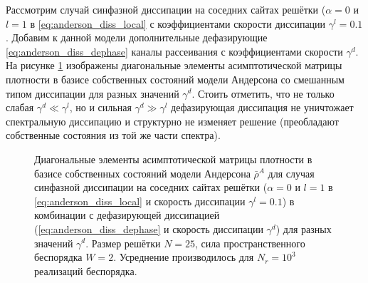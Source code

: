 Рассмотрим случай синфазной диссипации на соседних сайтах решётки (\(\alpha=0\) и \(l=1\) в \cref{eq:anderson_diss_local} с коэффициентами скорости диссипации \(\gamma^l = 0.1\). Добавим к данной модели дополнительные дефазирующие \cref{eq:anderson_diss_dephase} каналы рассеивания с коэффициентами скорости \(\gamma^d\). На рисунке \cref{fig:anderson_rho_nn_with_dephasing} изображены диагональные элементы асимптотической матрицы плотности в базисе собственных состояний модели Андерсона со смешанным типом диссипации для разных значений \(\gamma^d\). Стоить отметить, что не только слабая \(\gamma^d \ll \gamma^l\), но и сильная \(\gamma^d \gg \gamma^l\) дефазирующая диссипация не уничтожает спектральную диссипацию и структурно не изменяет решение (преобладают собственные состояния из той же части спектра).

\begin{figure}[ht]
	\caption[Диагональные элементы асимптотической матрицы плотности в базисе собственных состояний модели Андерсона для разных типов диссипации]{
		Диагональные элементы асимптотической матрицы плотности в базисе собственных состояний модели Андерсона \(\bar{\rho}^A\) для случая синфазной диссипации на соседних сайтах решётки (\(\alpha=0\) и \(l=1\) в \cref{eq:anderson_diss_local} и скорость диссипации \(\gamma^l=0.1\)) в комбинации с дефазирующей диссипацией (\cref{eq:anderson_diss_dephase} и скорость диссипации \(\gamma^d\)) для разных значений \(\gamma^d\). Размер решётки \(N=25\), сила пространственного беспорядка \(W=2\). Усреднение производилось для \(N_r = 10^3\) реализаций беспорядка. 
	}
	\label{fig:anderson_rho_nn_with_dephasing}
\end{figure}

